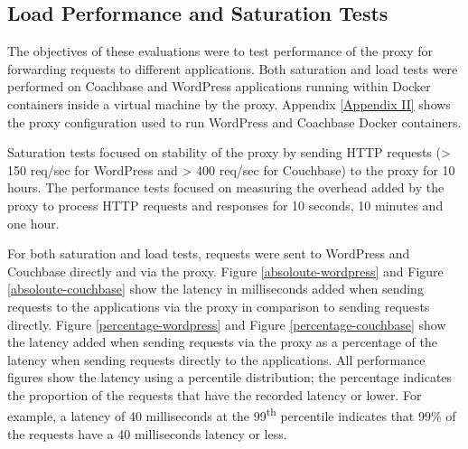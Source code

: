 \documentclass[a4paper,11pt,twoside]{report}
\begin{document}
\subsection{Load Performance and Saturation Tests}\label{load} 
The objectives of these evaluations were to test performance of the proxy for forwarding requests to different applications. Both saturation and load tests were performed on Coachbase and WordPress applications running within Docker containers inside a virtual machine by the proxy. Appendix \ref{Appendix II} shows the proxy configuration used to run WordPress and Coachbase Docker containers.\medskip

Saturation tests focused on stability of the proxy by sending HTTP requests (> 150 req/sec for WordPress and > 400 req/sec for Couchbase) to the proxy for 10 hours. The performance tests focused on measuring the overhead added by the proxy to process HTTP requests and responses for 10 seconds, 10 minutes and one hour. 

For both saturation and load tests, requests were sent to WordPress and Couchbase directly and via the proxy. Figure \ref{absoloute-wordpress} and Figure \ref{absoloute-couchbase} show the latency in milliseconds added when sending requests to the applications via the proxy in comparison to sending requests directly.  Figure \ref{percentage-wordpress} and Figure \ref{percentage-couchbase} show the latency added when sending requests via the proxy as a percentage of the latency when sending requests directly to the applications. All performance figures show the latency using a percentile distribution; the percentage indicates the proportion of the requests that have the recorded latency or lower. For example, a latency of 40 milliseconds at the 99\textsuperscript{th} percentile indicates that 99\% of the requests have a 40 milliseconds latency or less.   
\end{document}
